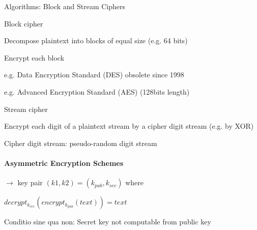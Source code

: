 \documentclass[a4paper]{article}
\begin{document}
\begin{multicols}{3}
    Algorithms: Block and Stream Ciphers
    \begin{itemize*}
        \item Block cipher
        \begin{itemize*}
            \item Decompose plaintext into blocks of equal size (e.g. 64 bits)
            \item Encrypt each block
            \item e.g. Data Encryption Standard (DES) obsolete since 1998
            \item e.g. Advanced Encryption Standard (AES) (128bits length)
        \end{itemize*}
        \item Stream cipher
        \begin{itemize*}
            \item Encrypt each digit of a plaintext stream by a cipher digit stream (e.g. by XOR)
            \item Cipher digit stream: pseudo-random digit stream
        \end{itemize*}
    \end{itemize*}

    \paragraph{Asymmetric Encryption Schemes}
    \begin{itemize*}
        \item[$\rightarrow$] key pair $(k1,k2) = (k_{pub} , k_{sec})$ where
        \item $decrypt_{k_{sec}} ( encrypt_{k_{pub}} (text)) = text$
        \item Conditio sine qua non: Secret key not computable from public key
    \end{itemize*}


\end{multicols}
\end{document}
